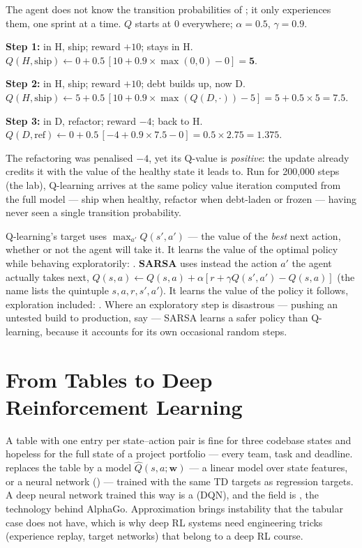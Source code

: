 \begin{worked}
The agent does not know the transition probabilities of ; it only
experiences them, one sprint at a time. $Q$ starts at 0 everywhere; $\alpha = 0.5$,
$\gamma = 0.9$.

\smallskip
\textbf{Step 1:} in H, ship; reward $+10$; stays in H.
$Q(H, \text{ship}) \leftarrow 0 + 0.5\,[10 + 0.9 \times \max(0, 0) - 0] = \mathbf{5}$.

\textbf{Step 2:} in H, ship; reward $+10$; debt builds up, now D.
$Q(H, \text{ship}) \leftarrow 5 + 0.5\,[10 + 0.9 \times \max(Q(D, \cdot)) - 5] = 5 + 0.5 \times 5 =
\mathbf{7.5}$.

\textbf{Step 3:} in D, refactor; reward $-4$; back to H.
$Q(D, \text{ref}) \leftarrow 0 + 0.5\,[-4 + 0.9 \times 7.5 - 0] = 0.5 \times 2.75 =
\mathbf{1.375}$.

\smallskip
The refactoring was penalised $-4$, yet its Q-value is \emph{positive}: the update
already credits it with the value of the healthy state it leads to. Run for 200{,}000
steps (the lab), Q-learning arrives at the same policy value iteration computed from
the full model --- ship when healthy, refactor when debt-laden or frozen --- having
never seen a single transition probability.
\end{worked}

\begin{conceptbox}
Q-learning's target uses $\max_{a'} Q(s', a')$ --- the value of the \emph{best} next
action, whether or not the agent will take it. It learns the value of the optimal
policy while behaving exploratorily: . \textbf{SARSA} uses instead the
action $a'$ the agent actually takes next,
$Q(s, a) \leftarrow Q(s, a) + \alpha[r + \gamma Q(s', a') - Q(s, a)]$ (the name lists the
quintuple $s, a, r, s', a'$). It learns the value of the policy it follows, exploration
included: . Where an exploratory step is disastrous --- pushing an
untested build to production, say --- SARSA learns a safer policy than Q-learning,
because it accounts for its own occasional random steps.
\end{conceptbox}

\section{From Tables to Deep Reinforcement Learning}

A table with one entry per state--action pair is fine for three codebase states and
hopeless for the full state of a project portfolio --- every team, task and deadline.
 replaces the table by a model $\hat{Q}(s, a; \mathbf{w})$
--- a linear model over state features, or a neural network () ---
trained with the same TD targets as regression targets. A deep neural network
trained this way is a  (DQN), and the field is , the technology behind AlphaGo. Approximation
brings instability that the tabular case does not have, which is why deep RL systems
need engineering tricks (experience replay, target networks) that belong to a deep
RL course.


